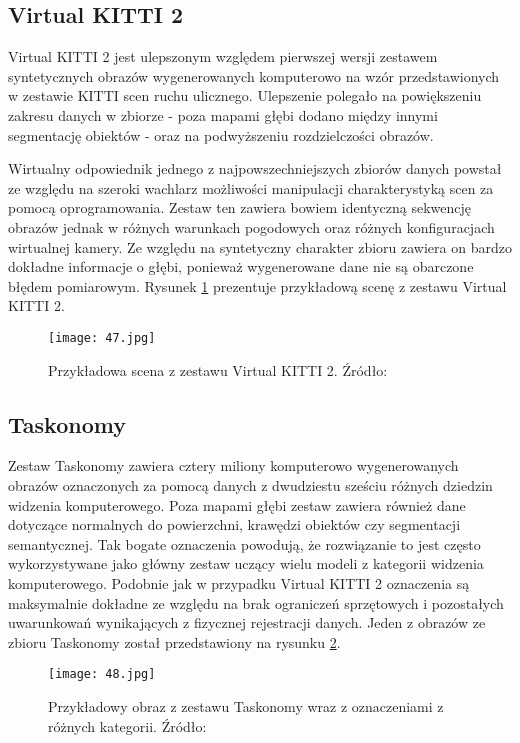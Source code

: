 \subsection{Virtual KITTI 2}
Virtual KITTI 2 \cite{cabon2020virtualkitti2} jest ulepszonym względem pierwszej wersji zestawem syntetycznych obrazów wygenerowanych komputerowo na wzór przedstawionych w zestawie KITTI \cite{geiger2012} scen ruchu ulicznego. Ulepszenie polegało na powiększeniu zakresu danych w zbiorze - poza mapami głębi dodano między innymi segmentację obiektów - oraz na podwyższeniu rozdzielczości obrazów.

Wirtualny odpowiednik jednego z najpowszechniejszych zbiorów danych powstał ze względu na szeroki wachlarz możliwości manipulacji charakterystyką scen za pomocą oprogramowania. Zestaw ten zawiera bowiem identyczną sekwencję obrazów jednak w różnych warunkach pogodowych oraz różnych konfiguracjach wirtualnej kamery. Ze względu na syntetyczny charakter zbioru zawiera on bardzo dokładne informacje o głębi, ponieważ wygenerowane dane nie są obarczone błędem pomiarowym.
Rysunek \ref{fig:vkitti-example} prezentuje przykładową scenę z zestawu Virtual KITTI 2.
\begin{figure}[H]
    \centering
    \texttt{[image: 47.jpg]}
    \caption{Przykładowa scena z zestawu Virtual KITTI 2. Źródło: \cite{cabon2020virtualkitti2}}
    \label{fig:vkitti-example}
\end{figure}

\subsection{Taskonomy}
Zestaw Taskonomy \cite{zamir2018taskonomydisentanglingtasktransfer} zawiera cztery miliony komputerowo wygenerowanych obrazów oznaczonych za pomocą danych z dwudziestu sześciu różnych dziedzin widzenia komputerowego. Poza mapami głębi zestaw zawiera również dane dotyczące normalnych do powierzchni, krawędzi obiektów czy segmentacji semantycznej. Tak bogate oznaczenia powodują, że rozwiązanie to jest często wykorzystywane jako główny zestaw uczący wielu modeli z kategorii widzenia komputerowego. Podobnie jak w przypadku Virtual KITTI 2 oznaczenia są maksymalnie dokładne ze względu na brak ograniczeń sprzętowych i pozostałych uwarunkowań wynikających z fizycznej rejestracji danych. Jeden z obrazów ze zbioru Taskonomy został przedstawiony na rysunku \ref{fig:taskonomy-example}.
\begin{figure}[H]
    \centering
    \texttt{[image: 48.jpg]}
    \caption{Przykładowy obraz z zestawu Taskonomy wraz z oznaczeniami z różnych kategorii. Źródło: \cite{zamir2018taskonomydisentanglingtasktransfer}}
    \label{fig:taskonomy-example}
\end{figure}

